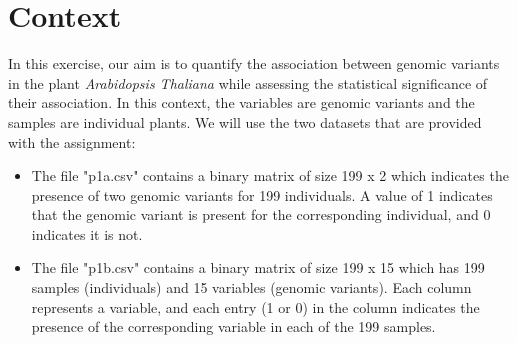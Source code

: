 \section*{Context}
In this exercise, our aim is to quantify the association between genomic variants in the plant {\em Arabidopsis Thaliana} while assessing the statistical significance of their association.
In this context, the variables are genomic variants and the samples are individual plants.  
We will use the two datasets that are provided with the assignment:

\begin{itemize}
\item The file "p1a.csv" contains a binary matrix of size 199 x 2 which indicates the presence of two genomic variants for 199 individuals. A value of 1 indicates that the genomic variant is present for the corresponding individual, and 0 indicates it is not.
\item The file "p1b.csv" contains a binary matrix of size 199 x 15 which has 199 samples (individuals) and 15 variables (genomic variants). Each column represents a variable, and each entry (1 or 0)  in the column indicates the presence of the corresponding variable in each of the 199 samples. 
\end{itemize}

\newpage
